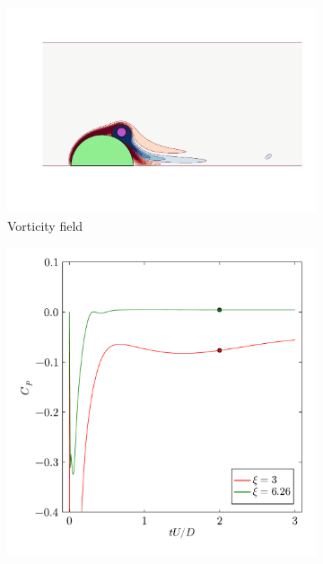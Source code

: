 \documentclass[final,3p,times]{elsarticle}
\begin{document}
\begin{figure}
    \centering
    \begin{subfigure}[t]{0.8\linewidth}
        \centering
        \includegraphics[width=\linewidth,trim={50 70 20 210},clip]{img/SpinCylFlood.pdf}
        \vspace{-1cm}
        \caption{Vorticity field}
    \end{subfigure}
    \begin{subfigure}[b]{0.38\linewidth}
        \includegraphics[width=\linewidth]{img/SpinCylHist.pdf}

\end{subfigure}
\end{figure}
\end{document}

